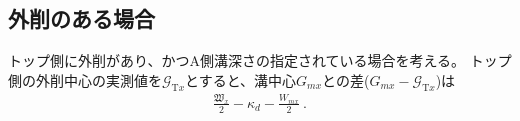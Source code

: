 \subsection{外削のある場合}
トップ側に外削があり、かつA側溝深さの指定されている場合を考える。
トップ側の外削中心の実測値を$\mathcal G_{\mathrm Tx}$とすると、溝中心$G_{mx}$との差($G_{mx}-\mathcal G_{\mathrm Tx}$)は
\begin{align}
  \label{eq:mizocenterAG}
  \frac{\mathfrak W_x}2-\kappa_d-\frac{W_{mx}}2\ .
\end{align}





























